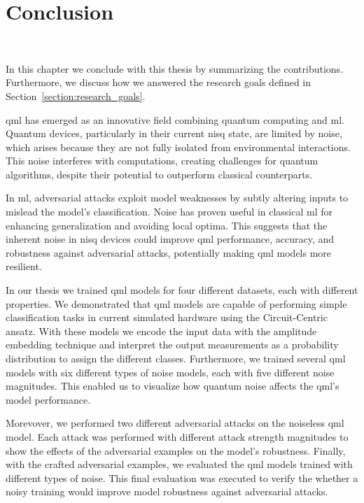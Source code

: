 \chapter{Conclusion}\label{chapter:conclusion} \

In this chapter we conclude with this thesis by summarizing
the contributions. Furthermore, we discuss how we answered
the research goals defined in Section~\ref{section:research_goals}. \

\ac{qml} has emerged as an innovative field combining quantum
computing and \ac{ml}. Quantum devices, particularly in their
current \ac{nisq} state, are limited by noise, which arises
because they are not fully isolated from environmental interactions.
This noise interferes with computations, creating challenges for
quantum algorithms, despite their potential to outperform classical
counterparts. \

In \ac{ml}, adversarial attacks exploit model weaknesses by
subtly altering inputs to mislead the model's classification.
Noise has proven useful in classical \ac{ml} for enhancing
generalization and avoiding local optima. This suggests that
the inherent noise in \ac{nisq} devices could improve \ac{qml}
performance, accuracy, and robustness against adversarial attacks,
potentially making \ac{qml} models more resilient. \

In our thesis we trained \ac{qml} models for four different
datasets, each with different properties. We demonstrated
that \ac{qml} models are capable of performing simple classification
tasks in current simulated hardware using the Circuit-Centric ansatz.
With these models we encode the input data with the amplitude embedding
technique and interpret the output measurements as a probability
distribution to assign the different classes. Furthermore,
we trained several \ac{qml} models with six different types
of noise models, each with five different noise magnitudes.
This enabled us to visualize how quantum noise affects
the \ac{qml}'s model performance. \

Morevover, we performed two different adversarial attacks on the
noiseless \ac{qml} model. Each attack was performed with different
attack strength magnitudes to show the effects of the adversarial
examples on the model's robustness. Finally, with the crafted
adversarial examples, we evaluated the \ac{qml} models trained
with different types of noise. This final evaluation was
executed to verify the whether a noisy training would improve
model robustness against adversarial attacks. \

